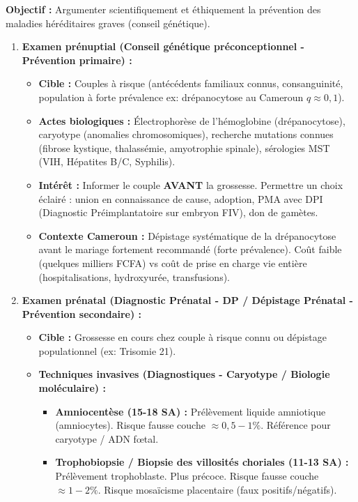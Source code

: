 \documentclass[11pt]{article}
\begin{document}
\begin{methode}
    \textbf{Objectif :} Argumenter scientifiquement et éthiquement la prévention des maladies héréditaires graves (conseil génétique).
    \begin{enumerate}
        \item \textbf{Examen prénuptial (Conseil génétique préconceptionnel - Prévention primaire) :}
              \begin{itemize}
                  \item \textbf{Cible :} Couples à risque (antécédents familiaux connus, consanguinité, population à forte prévalence ex: drépanocytose au Cameroun $q \approx 0,1$).
                  \item \textbf{Actes biologiques :} Électrophorèse de l'hémoglobine (drépanocytose), caryotype (anomalies chromosomiques), recherche mutations connues (fibrose kystique, thalassémie, amyotrophie spinale), sérologies MST (VIH, Hépatites B/C, Syphilis).
                  \item \textbf{Intérêt :} Informer le couple \textbf{AVANT} la grossesse. Permettre un choix éclairé : union en connaissance de cause, adoption, PMA avec DPI (Diagnostic Préimplantatoire sur embryon FIV), don de gamètes.
                  \item \textbf{Contexte Cameroun :} Dépistage systématique de la drépanocytose avant le mariage fortement recommandé (forte prévalence). Coût faible (quelques milliers FCFA) vs coût de prise en charge vie entière (hospitalisations, hydroxyurée, transfusions).
              \end{itemize}
        \item \textbf{Examen prénatal (Diagnostic Prénatal - DP / Dépistage Prénatal - Prévention secondaire) :}
              \begin{itemize}
                  \item \textbf{Cible :} Grossesse en cours chez couple à risque connu ou dépistage populationnel (ex: Trisomie 21).
                  \item \textbf{Techniques invasives (Diagnostiques - Caryotype / Biologie moléculaire) :}
                        \begin{itemize}
                            \item \textbf{Amniocentèse (15-18 SA) :} Prélèvement liquide amniotique (amniocytes). Risque fausse couche $\approx 0,5 - 1\%$. Référence pour caryotype / ADN fœtal.
                            \item \textbf{Trophobiopsie / Biopsie des villosités choriales (11-13 SA) :} Prélèvement trophoblaste. Plus précoce. Risque fausse couche $\approx 1-2\%$. Risque mosaïcisme placentaire (faux positifs/négatifs).

\end{itemize}
\end{itemize}
\end{enumerate}
\end{methode}
\end{document}
